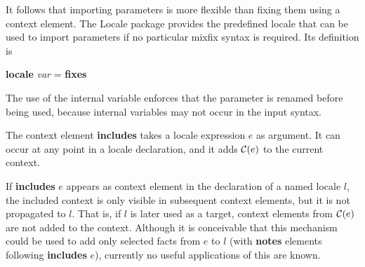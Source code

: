 \begin{isabellebody}
\begin{isamarkuptext}
  It follows that importing
  parameters is more flexible than fixing them using a context element.
  The Locale package provides the predefined locale  that
  can be used to import parameters if no
  particular mixfix syntax is required.
  Its definition is
\begin{center}
  \textbf{locale} \textit{var} = \textbf{fixes} 
\end{center}
   The use of the internal variable 
  enforces that the parameter is renamed before being used, because
  internal variables may not occur in the input syntax.%
\end{isamarkuptext}%
\isamarkuptrue%
%
\isamarkuptrue%
%
\begin{isamarkuptext}%
\label{sec-includes}
  The context element \textbf{includes} takes a locale expression $e$
  as argument.  It can occur at any point in a locale declaration, and
  it adds $\mathcal{C}(e)$ to the current context.

  If \textbf{includes} $e$ appears as context element in the
  declaration of a named locale $l$, the included context is only
  visible in subsequent context elements, but it is not propagated to
  $l$.  That is, if $l$ is later used as a target, context elements
  from $\mathcal{C}(e)$ are not added to the context.  Although it is
  conceivable that this mechanism could be used to add only selected
  facts from $e$ to $l$ (with \textbf{notes} elements following
  \textbf{includes} $e$), currently no useful applications of this are
  known.


\end{isamarkuptext}
\end{isabellebody}

